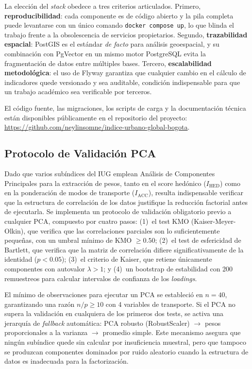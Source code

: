 \documentclass[12pt, a4paper, twoside, openright]{report}
\theoremstyle{plain}
\theoremstyle{definition}
\newcommand{\IHED}{I_{\text{HED}}} %
\newcommand{\IACC}{I_{\text{ACC}}} %
\begin{document}
La elección del \emph{stack} obedece a tres criterios articulados. Primero, \textbf{reproducibilidad}: cada componente es de código abierto y la pila completa puede levantarse con un único comando \texttt{docker compose up}, lo que blinda el trabajo frente a la obsolescencia de servicios propietarios. Segundo, \textbf{trazabilidad espacial}: PostGIS es el estándar \emph{de facto} para análisis geoespacial, y su combinación con PgVector en un mismo motor PostgreSQL evita la fragmentación de datos entre múltiples bases. Tercero, \textbf{escalabilidad metodológica}: el uso de Flyway garantiza que cualquier cambio en el cálculo de indicadores quede versionado y sea auditable, condición indispensable para que un trabajo académico sea verificable por terceros.

El código fuente, las migraciones, los scripts de carga y la documentación técnica están disponibles públicamente en el repositorio del proyecto: \url{https://github.com/neylinsomne/indice-urbano-global-bogota}.

\subsection{Protocolo de Validación PCA}
\label{subsec:validacion_pca}

Dado que varios subíndices del IUG emplean Análisis de Componentes Principales para la extracción de pesos, tanto en el score hedónico ($\IHED$) como en la ponderación de modos de transporte ($\IACC$), resulta indispensable verificar que la estructura de correlación de los datos justifique la reducción factorial antes de ejecutarla. Se implementa un protocolo de validación obligatorio previo a cualquier PCA, compuesto por cuatro pasos: (1)~el test KMO (Kaiser-Meyer-Olkin), que verifica que las correlaciones parciales son lo suficientemente pequeñas, con un umbral mínimo de KMO $\geq 0.50$; (2)~el test de esfericidad de Bartlett, que verifica que la matriz de correlación difiere significativamente de la identidad ($p < 0.05$); (3)~el criterio de Kaiser, que retiene únicamente componentes con autovalor $\lambda > 1$; y (4)~un bootstrap de estabilidad con 200 remuestreos para calcular intervalos de confianza de los \textit{loadings}.

El mínimo de observaciones para ejecutar un PCA se estableció en $n = 40$, garantizando una razón $n/p \geq 10$ con 4 variables de transporte. Si el PCA no supera la validación en cualquiera de los primeros dos tests, se activa una jerarquía de \textit{fallback} automática: PCA robusto (RobustScaler) $\to$ pesos proporcionales a la varianza $\to$ promedio simple. Este mecanismo asegura que ningún subíndice quede sin calcular por insuficiencia muestral, pero que tampoco se produzcan componentes dominados por ruido aleatorio cuando la estructura de datos es inadecuada para la factorización.
\end{document}
